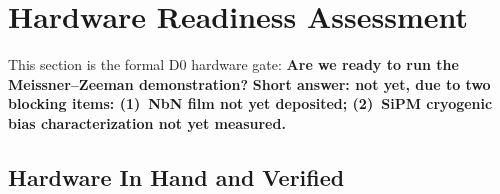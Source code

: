 
\section{Hardware Readiness Assessment}
\label{sec:hardware-readiness}

This section is the formal D0 hardware gate: \textbf{Are we ready to run the Meissner--Zeeman
demonstration?} \textbf{Short answer: not yet, due to two blocking items: (1)~NbN film not yet
deposited; (2)~SiPM cryogenic bias characterization not yet measured.}

\subsection{Hardware In Hand and Verified}

